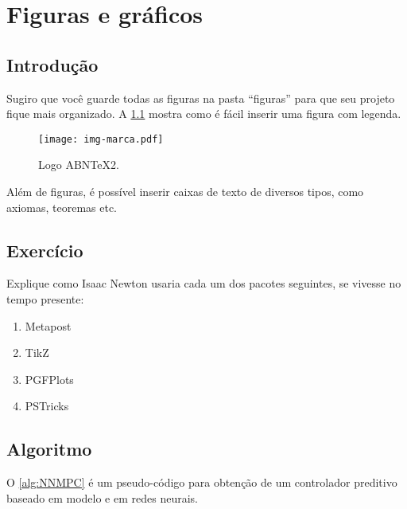 \chapter{Figuras e gráficos}

\section{Introdução}

Sugiro que você guarde todas as figuras na pasta ``figuras'' para que seu projeto fique mais organizado. A \cref{fig:logoabntex} mostra como é fácil inserir uma figura com legenda.

\begin{figure}[htb]
	\centering
	\begin{minipage}{0.8\linewidth}
		\centering
		\texttt{[image: img-marca.pdf]}
		\caption{Logo ABN\TeX2.} \label{fig:logoabntex}
	\end{minipage}
\end{figure}

Além de figuras, é possível inserir caixas de texto de diversos tipos, como axiomas, teoremas etc.

\section{Exercício}

\begin{exercise}
    Explique como Isaac Newton usaria cada um dos pacotes seguintes, se vivesse no tempo presente:
    \begin{enumerate}[label=(\Alph*)]
        \item Metapost
        \item TikZ
        \item PGFPlots
        \item PSTricks
    \end{enumerate}
\end{exercise}

\section{Algoritmo}

O \cref{alg:NNMPC} é um pseudo-código para obtenção de um controlador preditivo baseado em modelo e em redes neurais.

